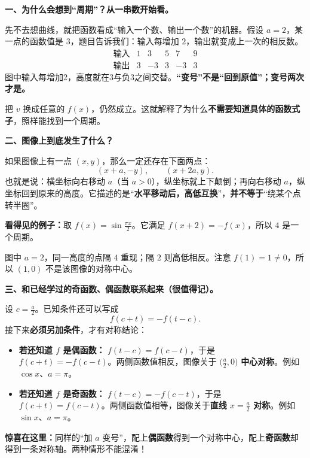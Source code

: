\clearpage
\begin{explanationbox}
\textbf{一、为什么会想到“周期”？从一串数开始看。}



先不去想曲线，就把函数看成“输入一个数、输出一个数”的机器。假设 $a=2$，某一点的函数值是 $3$，题目告诉我们：输入每增加 $2$，输出就变成上一次的相反数。
\[
\begin{array}{c|ccccc}
\text{输入}&1&3&5&7&9\\\hline
\text{输出}&3&-3&3&-3&3
\end{array}
\]
图中输入每增加2，高度就在3与负3之间交替。\textbf{“变号”不是“回到原值”；变号两次才是。}


把 $v$ 换成任意的 $f(x)$，仍然成立。这就解释了为什么\textbf{不需要知道具体的函数式子}，照样能找到一个周期。

\medskip
\end{explanationbox}\clearpage\begin{explanationbox}\textbf{二、图像上到底发生了什么？}



如果图像上有一点 $(x,y)$，那么一定还存在下面两点：
\[
(x+a,-y),\qquad (x+2a,y).
\]
也就是说：横坐标向右移动 $a$（当 $a>0$），纵坐标就上下颠倒；再向右移动 $a$，纵坐标回到原来的高度。它描述的是“\textbf{水平移动后，高低互换}”，\textbf{并不等于}“绕某个点转半圈”。

\textbf{看得见的例子：}取 $f(x)=\sin\!\frac{\pi x}{2}$。它满足 $f(x+2)=-f(x)$，所以 $4$ 是一个周期。

图中 $a=2$，同一高度的点隔 $4$ 重现；隔 $2$ 则高低相反。注意 $f(1)=1\ne0$，所以 $(1,0)$ 不是该图像的对称中心。

\medskip
\end{explanationbox}\clearpage\begin{explanationbox}\textbf{三、和已经学过的奇函数、偶函数联系起来（很值得记）。}



设 $c=\frac a2$。已知条件还可以写成
\[
f(c+t)=-f(t-c).
\]
接下来\textbf{必须另加条件}，才有对称结论：
\begin{itemize}[leftmargin=*,itemsep=0.5em]
\item \textbf{若还知道 $f$ 是偶函数：} $f(t-c)=f(c-t)$，于是 $f(c+t)=-f(c-t)$。两侧函数值相反，图像关于 $\bigl(\frac a2,0\bigr)$ \textbf{中心对称}。例如 $\cos x$、$a=\pi$。
\item \textbf{若还知道 $f$ 是奇函数：} $f(t-c)=-f(c-t)$，于是 $f(c+t)=f(c-t)$。两侧函数值相等，图像关于\textbf{直线 $x=\frac a2$ 对称}。例如 $\sin x$、$a=\pi$。
\end{itemize}
\textbf{惊喜在这里：}同样的“加 $a$ 变号”，配上\textbf{偶函数}得到一个对称中心，配上\textbf{奇函数}却得到一条对称轴。两种情形不能混淆！


\end{explanationbox}
